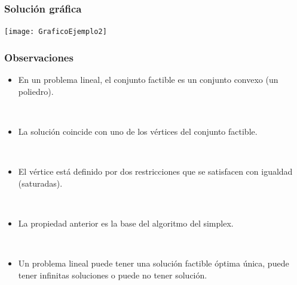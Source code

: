 \documentclass{beamer}
\begin{document}
\begin{frame}
\frametitle{Solución gráfica}

\texttt{[image: GraficoEjemplo2]}

\end{frame}
\begin{frame}
\frametitle{Observaciones}

\begin{itemize}
\item En un problema lineal, el conjunto factible es un conjunto convexo (un poliedro).

\

\item La solución coincide con uno de los vértices del conjunto factible.

\

\item El vértice está definido por dos restricciones que se satisfacen con igualdad (saturadas).

\

\item La propiedad anterior es la base del algoritmo del simplex.

\

\item Un problema lineal puede tener una solución factible óptima única, puede tener infinitas soluciones o puede no tener solución.

\end{itemize}

\end{frame}
\end{document}
